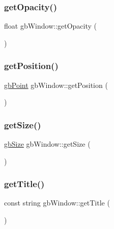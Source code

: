 \subsubsection{\texorpdfstring{getOpacity()}{getOpacity()}}
{\footnotesize\ttfamily float gb\+Window\+::get\+Opacity (\begin{DoxyParamCaption}{ }\end{DoxyParamCaption})}

\mbox{\label{classgb_window_a694817c835e86e52cb18c5d70726ca1c}} 
\subsubsection{\texorpdfstring{getPosition()}{getPosition()}}
{\footnotesize\ttfamily \mbox{\hyperlink{classgb_point}{gb\+Point}} gb\+Window\+::get\+Position (\begin{DoxyParamCaption}{ }\end{DoxyParamCaption})}

\mbox{\label{classgb_window_a0a5f9d324a9d81167d9e7b1721587ec4}} 
\subsubsection{\texorpdfstring{getSize()}{getSize()}}
{\footnotesize\ttfamily \mbox{\hyperlink{classgb_size}{gb\+Size}} gb\+Window\+::get\+Size (\begin{DoxyParamCaption}{ }\end{DoxyParamCaption})}

\mbox{\label{classgb_window_a470388bdcea1c7ed3ee77ddb9ecb5a46}} 
\subsubsection{\texorpdfstring{getTitle()}{getTitle()}}
{\footnotesize\ttfamily const string gb\+Window\+::get\+Title (\begin{DoxyParamCaption}{ }\end{DoxyParamCaption})}

\mbox{\label{classgb_window_abda1af6601c41ace2731cfeff9312927}} 
